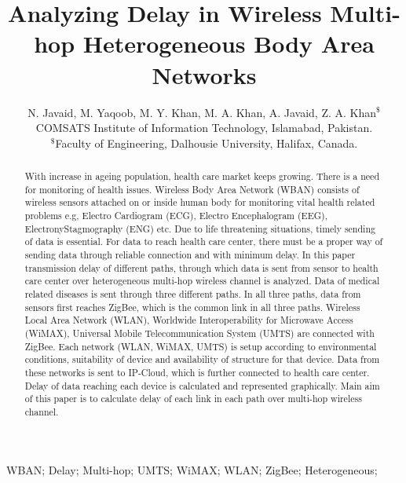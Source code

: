 \documentclass[11pt, conference, compsocconf, onecolumn]{IEEEtran}
\begin{document}
\title{Analyzing Delay in Wireless Multi-hop Heterogeneous Body Area Networks}

\author{N. Javaid, M. Yaqoob, M. Y. Khan, M. A. Khan, A. Javaid, Z. A. Khan$^{\$}$\\
COMSATS Institute of Information Technology, Islamabad, Pakistan. \\
        $^{\$}$Faculty of Engineering, Dalhousie University, Halifax, Canada.\\
     }

\maketitle

\begin{abstract}
With increase in ageing population, health care market keeps growing. There is a need for monitoring of health issues. Wireless Body Area Network (WBAN) consists of wireless sensors attached on or inside human body for monitoring vital health related problems e.g, Electro Cardiogram (ECG), Electro Encephalogram (EEG), ElectronyStagmography (ENG) etc. Due to life threatening  situations, timely sending of data is essential. For data to reach health care center, there must be a proper way of sending data through reliable connection and with minimum delay. In this paper transmission delay of different paths, through which data is sent from sensor to health care center over heterogeneous multi-hop wireless channel is analyzed. Data of medical related diseases is sent through three different paths. In all three paths, data from sensors first reaches ZigBee, which is the common link in all three paths. Wireless Local Area Network (WLAN), Worldwide Interoperability for Microwave Access (WiMAX), Universal Mobile Telecommunication System (UMTS) are connected with ZigBee. Each network (WLAN, WiMAX, UMTS) is setup according to environmental conditions, suitability of device and availability of structure for that device. Data from these networks is sent to IP-Cloud, which is further connected to health care center. Delay of data reaching each device is calculated and represented graphically. Main aim of this paper is to calculate delay of each link in each path over multi-hop wireless channel.
\end{abstract}
\begin{IEEEkeywords}

WBAN; Delay; Multi-hop; UMTS; WiMAX; WLAN; ZigBee; Heterogeneous;

\end{IEEEkeywords}
\end{document}
